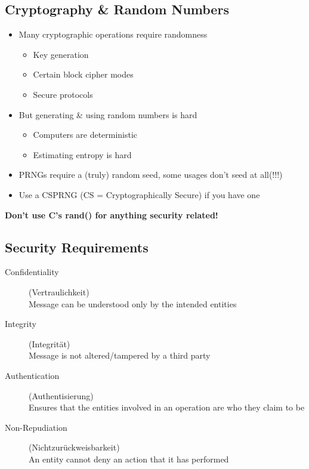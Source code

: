 \subsection{Cryptography \& Random Numbers}
\begin{itemize}
  \item Many cryptographic operations require randomness
        \begin{itemize}
          \item Key generation
          \item Certain block cipher modes
          \item Secure protocols
        \end{itemize}
  \item But generating \& using random numbers is hard
        \begin{itemize}
          \item Computers are deterministic
          \item Estimating entropy is hard
        \end{itemize}
  \item PRNGs require a (truly) random seed, some usages don't seed at all(!!!)
  \item Use a CSPRNG (CS = Cryptographically Secure) if you have one
\end{itemize}
\textbf{Don't use C's rand() for anything security related!}

\subsection{Security Requirements}
\begin{description}
  \item[Confidentiality] (Vertraulichkeit)\\ Message can be understood only by the intended entities
  \item[Integrity] (Integrität)\\ Message is not altered/tampered by a third party
  \item[Authentication] (Authentisierung)\\ Ensures that the entities involved in an operation are who they claim to be
  \item[Non-Repudiation] (Nichtzurückweisbarkeit)\\ An entity cannot deny an action that it has performed
\end{description}

